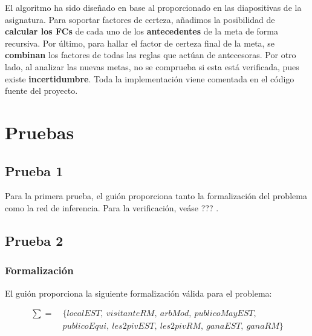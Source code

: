 \documentclass[a4paper,11pt, includehead]{article}
\begin{document}
\clearpage

El algoritmo ha sido diseñado en base al proporcionado en las diapositivas de la asignatura. Para soportar factores de certeza, añadimos la posibilidad de \textbf{calcular los FCs} de cada uno de los \textbf{antecedentes} de la meta de forma recursiva. Por último, para hallar el factor de certeza final de la meta, se \textbf{combinan} los factores de todas las reglas que actúan de antecesoras. Por otro lado, al analizar las nuevas metas, no se comprueba si esta está verificada, pues existe \textbf{incertidumbre}. Toda la implementación viene comentada en el código fuente del proyecto.

\section{Pruebas}
\subsection{Prueba 1}
Para la primera prueba, el guión proporciona tanto la formalización del problema como la red de inferencia. Para la verificación, veáse ??? .

\subsection{Prueba 2}
\subsubsection{Formalización}
\noindent El guión proporciona la siguiente formalización válida para el problema:

{\small 
\begin{align*}
	\sum = & \ \{localEST,\ visitanteRM,\ arbMod,\ publicoMayEST, \\
	& \ publicoEqui,\ les2pivEST,\ les2pivRM,\ ganaEST,\ ganaRM \}
\end{align*}}
\end{document}
